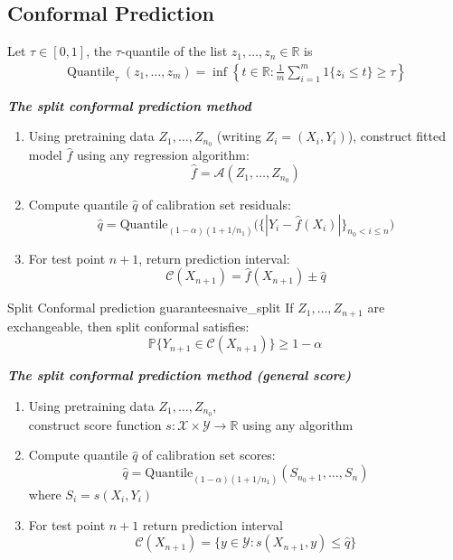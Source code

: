 \subsection{Conformal Prediction}

\begin{defn}[Quantile]
    Let $\tau \in [0,1]$, the $\tau$-quantile of the list $z_1,\dots,z_n\in \mathbb{R}$ is 
    \begin{align*}
        \operatorname{Quantile}_\tau(z_1,\dots,z_m) = \inf\left\{ t\in\mathbb{R}\colon \frac{1}{m}\sum_{i=1}^m1\{z_i\leq t\} \geq \tau\right\}
    \end{align*}
\end{defn}

\emph{\textbf{The split conformal prediction method}}

\begin{enumerate}
    \item Using pretraining data $Z_1, \dots, Z_{n_0}$ (writing $Z_i = (X_i, Y_i)$), construct fitted model $\widehat{f}$ using any regression algorithm:
    \[
    \widehat{f} = \mathcal{A}(Z_1, \dots, Z_{n_0})
    \]

    \item Compute quantile $\widehat{q}$ of calibration set residuals:
    \[
    \widehat{q} = \text{Quantile}_{(1-\alpha)(1+1/n_1)}\Big(\{|Y_i - \widehat{f}(X_i)|\}_{n_0 < i \leq n}\Big)
    \]

    \item For test point $n + 1$, return prediction interval:
    \[
    \mathcal{C}(X_{n+1}) = \widehat{f}(X_{n+1}) \pm \widehat{q}
    \]
\end{enumerate}


\begin{thm}{Split Conformal prediction guarantees}{naive_split}
If $Z_1, \dots, Z_{n+1}$ are exchangeable, then split conformal satisfies:
\[
\mathbb{P}\{Y_{n+1} \in \mathcal{C}(X_{n+1})\} \geq 1 - \alpha
\]
\end{thm}

\emph{\textbf{The split conformal prediction method (general score)}}

\begin{enumerate}
    \item Using pretraining data $Z_1, \dots, Z_{n_0}$, \\
    construct score function $s : \mathcal{X} \times \mathcal{Y} \to \mathbb{R}$ using any algorithm
    
    \item Compute quantile $\widehat{q}$ of calibration set scores:
    \[
    \widehat{q} = \text{Quantile}_{(1-\alpha)(1+1/n_1)}(S_{n_0+1}, \dots, S_n)
    \]
    where $S_i = s(X_i, Y_i)$
    
    \item For test point $n + 1$ return prediction interval
    \[
    \mathcal{C}(X_{n+1}) = \{y \in \mathcal{Y} : s(X_{n+1}, y) \leq \widehat{q}\}
    \]
\end{enumerate}

